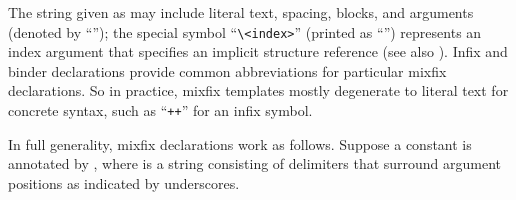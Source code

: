 \begin{isabellebody}
\begin{isamarkuptext}
  The string given as  may include literal text,
  spacing, blocks, and arguments (denoted by ``''); the
  special symbol ``\verb|\<index>|'' (printed as ``'')
  represents an index argument that specifies an implicit structure
  reference (see also ).  Infix and binder
  declarations provide common abbreviations for particular mixfix
  declarations.  So in practice, mixfix templates mostly degenerate to
  literal text for concrete syntax, such as ``\verb|++|'' for
  an infix symbol.%
\end{isamarkuptext}%
\isamarkuptrue%
%
\isamarkuptrue%
%
\begin{isamarkuptext}%
In full generality, mixfix declarations work as follows.
  Suppose a constant  is annotated by
  , where  is a string
   consisting of delimiters that surround
  argument positions as indicated by underscores.


\end{isamarkuptext}
\end{isabellebody}
